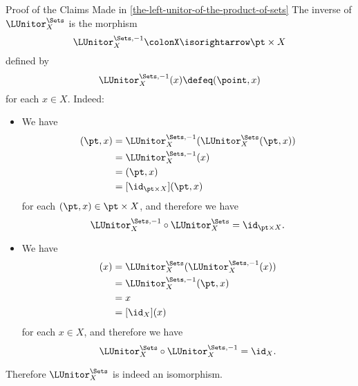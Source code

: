 \begin{Proof}{Proof of the Claims Made in \cref{the-left-unitor-of-the-product-of-sets}}%
    The inverse of $\LUnitor^{\Sets}_{X}$ is the morphism
    \[
        \LUnitor^{\Sets,-1}_{X}%
        \colon%
        X%
        \isorightarrow%
        \pt\times X%
    \]%
    defined by
    \[
        \LUnitor^{\Sets,-1}_{X}(x)%
        \defeq%
        (\point,x)
    \]%
    for each $x\in X$. Indeed:
    \begin{itemize}
        \item{}We have
            \begin{align*}
                [\LUnitor^{\Sets,-1}_{X}\circ\LUnitor^{\Sets}_{X}](\pt,x) &= \LUnitor^{\Sets,-1}_{X}(\LUnitor^{\Sets}_{X}(\pt,x))\\
                                                                          &= \LUnitor^{\Sets,-1}_{X}(x)\\
                                                                          &= (\pt,x)\\
                                                                          &= [\id_{\pt\times X}](\pt,x)
            \end{align*}
            for each $(\pt,x)\in\pt\times X$, and therefore we have
            \[
                \LUnitor^{\Sets,-1}_{X}%
                \circ%
                \LUnitor^{\Sets}_{X}%
                =%
                \id_{\pt\times X}.%
            \]%
        \item{}We have
            \begin{align*}
                [\LUnitor^{\Sets}_{X}\circ\LUnitor^{\Sets,-1}_{X}](x) &= \LUnitor^{\Sets}_{X}(\LUnitor^{\Sets,-1}_{X}(x))\\
                                                                      &= \LUnitor^{\Sets,-1}_{X}(\pt,x)\\
                                                                      &= x\\
                                                                      &= [\id_{X}](x)
            \end{align*}
            for each $x\in X$, and therefore we have
            \[
                \LUnitor^{\Sets}_{X}%
                \circ%
                \LUnitor^{\Sets,-1}_{X}%
                =%
                \id_{X}.%
            \]%
    \end{itemize}
    Therefore $\LUnitor^{\Sets}_{X}$ is indeed an isomorphism.


\end{Proof}
